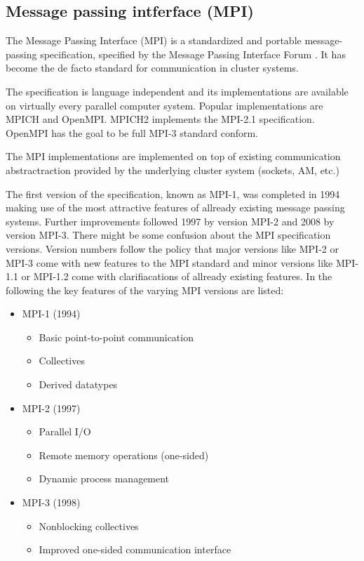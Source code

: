 \subsection{Message passing intferface (MPI)}
\label{sec:mpi}
The Message Passing Interface (MPI) is a standardized and portable
message-passing specification, specified by the Message Passing
Interface Forum \cite{ref:mpi_specification}. It has become the de
facto standard for communication in cluster systems.

The specification is language independent and its implementations are
available on virtually every parallel computer system.  Popular
implementations are MPICH and OpenMPI. MPICH2 implements the MPI-2.1
specification. OpenMPI has the goal to be full MPI-3 standard conform.

The MPI implementations are implemented on top of existing communication
abstractraction provided by the underlying cluster system (sockets,
AM, etc.)

The first version of the specification, known as MPI-1, was completed
in 1994 making use of the most attractive features of allready
existing message passing systems.  Further improvements followed 1997
by version MPI-2 and 2008 by version MPI-3. There might be some
confusion about the MPI specification versions. Version numbers follow
the policy that major versions like MPI-2 or MPI-3 come with new
features to the MPI standard and minor versions like MPI-1.1 or
MPI-1.2 come with clarifiacations of allready existing features. In
the following the key features of the varying MPI versions are listed:

\begin{itemize}
  \item MPI-1 (1994)
    \begin{itemize}
      \item Basic point-to-point communication
      \item Collectives
      \item Derived datatypes
    \end{itemize}
  \item MPI-2 (1997)
    \begin{itemize}
      \item Parallel I/O
      \item Remote memory operations (one-sided)
      \item Dynamic process management
    \end{itemize}
  \item MPI-3 (1998)
    \begin{itemize}
      \item Nonblocking collectives
      \item Improved one-sided communication interface
    \end{itemize}
\end{itemize}

